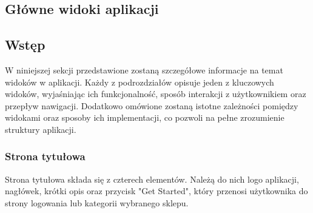 \subsection{Główne widoki aplikacji}

\subsection{Wstęp}

W niniejszej sekcji przedstawione zostaną szczegółowe informacje na temat widoków w aplikacji. Każdy z podrozdziałów opisuje jeden z kluczowych widoków, wyjaśniając ich funkcjonalność, sposób interakcji z użytkownikiem oraz przepływ nawigacji. Dodatkowo omówione zostaną istotne zależności pomiędzy widokami oraz sposoby ich implementacji, co pozwoli na pełne zrozumienie struktury aplikacji.

\subsubsection{Strona tytułowa}

Strona tytułowa składa się z czterech elementów. Należą do nich logo aplikacji, nagłówek, krótki opis oraz przycisk "Get Started", który przenosi użytkownika do strony logowania lub kategorii wybranego sklepu.


